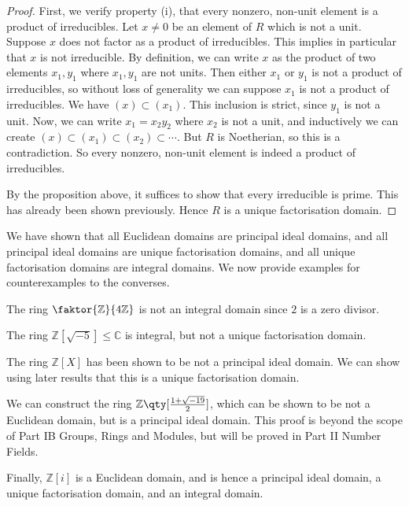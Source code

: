 \begin{proof}
	First, we verify property (i), that every nonzero, non-unit element is a product of irreducibles.
	Let $x \neq 0$ be an element of $R$ which is not a unit.
	Suppose $x$ does not factor as a product of irreducibles.
	This implies in particular that $x$ is not irreducible.
	By definition, we can write $x$ as the product of two elements $x_1, y_1$ where $x_1, y_1$ are not units.
	Then either $x_1$ or $y_1$ is not a product of irreducibles, so without loss of generality we can suppose $x_1$ is not a product of irreducibles.
	We have $(x) \subset (x_1)$.
	This inclusion is strict, since $y_1$ is not a unit.
	Now, we can write $x_1 = x_2 y_2$ where $x_2$ is not a unit, and inductively we can create $(x) \subset (x_1) \subset (x_2) \subset \cdots$.
	But $R$ is Noetherian, so this is a contradiction.
	So every nonzero, non-unit element is indeed a product of irreducibles.

	By the proposition above, it suffices to show that every irreducible is prime.
	This has already been shown previously.
	Hence $R$ is a unique factorisation domain.
\end{proof}
\begin{example}
	We have shown that all Euclidean domains are principal ideal domains, and all principal ideal domains are unique factorisation domains, and all unique factorisation domains are integral domains.
	We now provide examples for counterexamples to the converses.

	The ring $\faktor{\mathbb Z}{4\mathbb Z}$ is not an integral domain since $2$ is a zero divisor.

	The ring $\mathbb Z[\sqrt{-5}] \leq \mathbb C$ is integral, but not a unique factorisation domain.

	The ring $\mathbb Z[X]$ has been shown to be not a principal ideal domain.
	We can show using later results that this is a unique factorisation domain.

	We can construct the ring $\mathbb Z\qty[\frac{1+\sqrt{-19}}{2}]$, which can be shown to be not a Euclidean domain, but is a principal ideal domain.
	This proof is beyond the scope of Part IB Groups, Rings and Modules, but will be proved in Part II Number Fields.

	Finally, $\mathbb Z[i]$ is a Euclidean domain, and is hence a principal ideal domain, a unique factorisation domain, and an integral domain.
\end{example}
